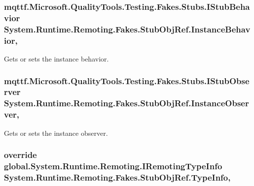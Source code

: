 \hypertarget{class_system_1_1_runtime_1_1_remoting_1_1_fakes_1_1_stub_obj_ref_a837205591f20278a399345b688b3da43}{
\subsubsection[{Instance\-Behavior}]{\setlength{\rightskip}{0pt plus 5cm}mqttf.\-Microsoft.\-Quality\-Tools.\-Testing.\-Fakes.\-Stubs.\-I\-Stub\-Behavior System.\-Runtime.\-Remoting.\-Fakes.\-Stub\-Obj\-Ref.\-Instance\-Behavior\hspace{0.3cm}{\ttfamily [get]}, {\ttfamily [set]}}}\label{class_system_1_1_runtime_1_1_remoting_1_1_fakes_1_1_stub_obj_ref_a837205591f20278a399345b688b3da43}


Gets or sets the instance behavior.

\hypertarget{class_system_1_1_runtime_1_1_remoting_1_1_fakes_1_1_stub_obj_ref_ad4c4c3316164ec4a35d10b13f8631c63}{
\subsubsection[{Instance\-Observer}]{\setlength{\rightskip}{0pt plus 5cm}mqttf.\-Microsoft.\-Quality\-Tools.\-Testing.\-Fakes.\-Stubs.\-I\-Stub\-Observer System.\-Runtime.\-Remoting.\-Fakes.\-Stub\-Obj\-Ref.\-Instance\-Observer\hspace{0.3cm}{\ttfamily [get]}, {\ttfamily [set]}}}\label{class_system_1_1_runtime_1_1_remoting_1_1_fakes_1_1_stub_obj_ref_ad4c4c3316164ec4a35d10b13f8631c63}


Gets or sets the instance observer.

\hypertarget{class_system_1_1_runtime_1_1_remoting_1_1_fakes_1_1_stub_obj_ref_a1747b0cebd6bd823c163287596cfc99a}{
\subsubsection[{Type\-Info}]{\setlength{\rightskip}{0pt plus 5cm}override global.\-System.\-Runtime.\-Remoting.\-I\-Remoting\-Type\-Info System.\-Runtime.\-Remoting.\-Fakes.\-Stub\-Obj\-Ref.\-Type\-Info\hspace{0.3cm}{\ttfamily [get]}, {\ttfamily [set]}}}\label{class_system_1_1_runtime_1_1_remoting_1_1_fakes_1_1_stub_obj_ref_a1747b0cebd6bd823c163287596cfc99a}


